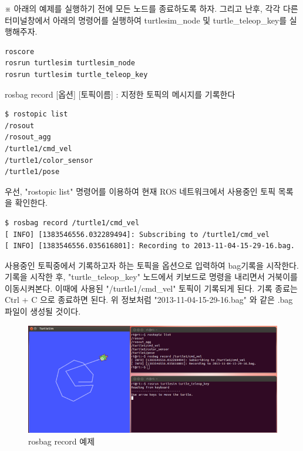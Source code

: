 \vspace{\baselineskip}
\noindent
※ 아래의 예제를 실행하기 전에 모든 노드를 종료하도록 하자. 그리고 난후, 각각 다른 터미널창에서 아래의 명령어를 실행하여 turtlesim\_node 및 turtle\_teleop\_key를 실행해주자.

\begin{lstlisting}[language=ROS]
roscore
rosrun turtlesim turtlesim_node 
rosrun turtlesim turtle_teleop_key
\end{lstlisting}

\setcounter{num}{0}

\vspace{\baselineskip}
\noindent
{}\circled{\thenum} rosbag record [옵션] [토픽이름] : 지정한 토픽의 메시지를 기록한다

\begin{lstlisting}[language=ROS]
$ rostopic list
/rosout
/rosout_agg
/turtle1/cmd_vel
/turtle1/color_sensor
/turtle1/pose
\end{lstlisting}

\noindent
우선, "rostopic list" 명령어를 이용하여 현재 ROS 네트워크에서 사용중인 토픽 목록을 확인한다.

\begin{lstlisting}[language=ROS]
$ rosbag record /turtle1/cmd_vel
[ INFO] [1383546556.032289494]: Subscribing to /turtle1/cmd_vel
[ INFO] [1383546556.035616801]: Recording to 2013-11-04-15-29-16.bag.
\end{lstlisting}

\noindent
사용중인 토픽중에서 기록하고자 하는 토픽을 옵션으로 입력하여 bag기록을 시작한다. 기록을 시작한 후, "turtle\_teleop\_key" 노드에서 키보드로 명령을 내리면서 거북이를 이동시켜본다. 이때에 사용된 "/turtle1/cmd\_vel" 토픽이 기록되게 된다. 기록 종료는 Ctrl + C 으로 종료하면 된다. 위 정보처럼 "2013-11-04-15-29-16.bag" 와 같은 .bag 파일이 생성될 것이다.

\begin{figure}[h]
\centering\includegraphics[width=0.8\columnwidth]{pictures/chapter5/rosbag_record.png}
\caption{rosbag record 예제}
\end{figure}

